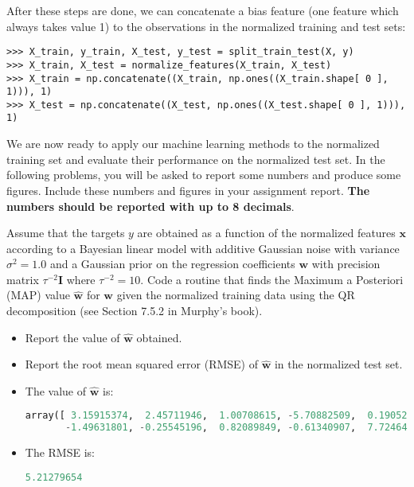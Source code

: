 \documentclass[submit]{harvardml}
\theoremstyle{plain}
\begin{document}
After these steps are done, we can concatenate a bias feature (one feature which
always takes value 1) to the observations in the normalized training and test sets:
\begin{verbatim}
>>> X_train, y_train, X_test, y_test = split_train_test(X, y)
>>> X_train, X_test = normalize_features(X_train, X_test)
>>> X_train = np.concatenate((X_train, np.ones((X_train.shape[ 0 ], 1))), 1)
>>> X_test = np.concatenate((X_test, np.ones((X_test.shape[ 0 ], 1))), 1)
\end{verbatim}
We are now ready to apply our machine learning methods to the normalized training set and
evaluate their performance on the normalized test set.
In the following problems, you will be asked to report some numbers and produce
some figures. Include these numbers and figures in your assignment report.
{\bf The numbers should be reported with up to 8 decimals}.



\begin{problem}[7pts]\label{prob:analytic_linear_model}
Assume that the targets $y$ are obtained as a function of the normalized
features $\mathbf{x}$ according to a Bayesian linear model with additive Gaussian noise with variance
$\sigma^2 = 1.0$ and a Gaussian prior on the regression coefficients $\mathbf{w}$
with precision matrix $\tau^{-2}\mathbf{I}$ where $\tau^{-2} = 10$. Code a routine that finds the Maximum a
Posteriori (MAP) value $\hat{\mathbf{w}}$ for $\mathbf{w}$ given the normalized
training data using the QR decomposition (see Section 7.5.2 in Murphy's book).
\begin{itemize}
\item Report the value of $\hat{\mathbf{w}}$ obtained.
\item Report the root mean squared error (RMSE) of $\hat{\mathbf{w}}$ in the normalized test set.
\end{itemize}
\end{problem}

\begin{itemize}
\item The value of $\hat{\mathbf{w}}$ is:
\begin{lstlisting}[language=Python]
array([ 3.15915374,  2.45711946,  1.00708615, -5.70882509,  0.19052137,
       -1.49631801, -0.25545196,  0.82089849, -0.61340907,  7.72464619])
\end{lstlisting}
\item The RMSE is:
\begin{lstlisting}[language=Python]
5.21279654
\end{lstlisting}
\end{itemize}
\end{document}
